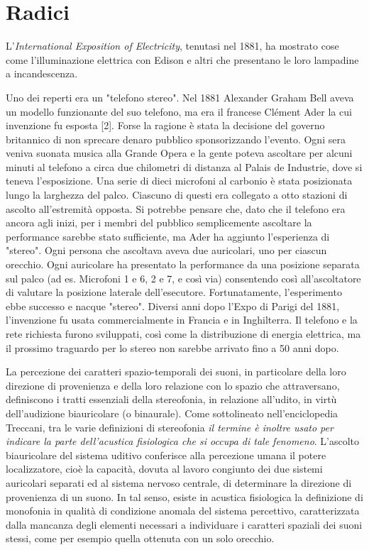 \section{Radici}

L'\emph{International Exposition of Electricity}, tenutasi nel 1881, ha mostrato
cose come l'illuminazione elettrica con Edison e altri che presentano le loro
lampadine a incandescenza.

Uno dei reperti era un "telefono stereo". Nel 1881 Alexander Graham Bell aveva un modello funzionante del suo telefono, ma era il francese Clément Ader la cui invenzione fu esposta [2]. Forse la ragione è stata la decisione del governo britannico di non sprecare denaro pubblico sponsorizzando l'evento. Ogni sera veniva suonata musica alla Grande Opera e la gente poteva ascoltare per alcuni minuti al telefono a circa due chilometri di distanza al Palais de Industrie, dove si teneva l'esposizione. Una serie di dieci microfoni al carbonio è stata posizionata lungo la larghezza del palco. Ciascuno di questi era collegato a otto stazioni di ascolto all'estremità opposta. Si potrebbe pensare che, dato che il telefono era ancora agli inizi, per i membri del pubblico semplicemente ascoltare la performance sarebbe stato sufficiente, ma Ader ha aggiunto l'esperienza di "stereo". Ogni persona che ascoltava aveva due auricolari, uno per ciascun orecchio. Ogni auricolare ha presentato la performance da una posizione separata sul palco (ad es. Microfoni 1 e 6, 2 e 7, e così via) consentendo così all'ascoltatore di valutare la posizione laterale dell'esecutore. Fortunatamente, l'esperimento ebbe successo e nacque "stereo". Diversi anni dopo l'Expo di Parigi del 1881, l'invenzione fu usata commercialmente in Francia e in Inghilterra. Il telefono e la rete richiesta furono sviluppati, così come la distribuzione di energia elettrica, ma il prossimo traguardo per lo stereo non sarebbe arrivato fino a 50 anni dopo.

La percezione dei caratteri spazio-temporali dei suoni, in particolare della
loro direzione di provenienza e della loro relazione con lo spazio che
attraversano, definiscono i tratti essenziali della stereofonia, in relazione
all'udito, in virtù dell’audizione biauricolare (o binaurale). Come sottolineato
nell'enciclopedia Treccani, tra le varie definizioni di stereofonia \emph{il
termine è inoltre usato per indicare la parte dell’acustica fisiologica
che si occupa di tale fenomeno}. L'ascolto biauricolare del sistema uditivo
conferisce alla percezione umana il potere localizzatore, cioè la capacità,
dovuta al lavoro congiunto dei due sistemi auricolari separati ed al sistema
nervoso centrale, di determinare la direzione di provenienza di un suono. In tal
senso, esiste in acustica fisiologica la definizione di monofonia in qualità di
condizione anomala del sistema percettivo, caratterizzata dalla mancanza degli
elementi necessari a individuare i caratteri spaziali dei suoni stessi, come per
esempio quella ottenuta con un solo orecchio.

